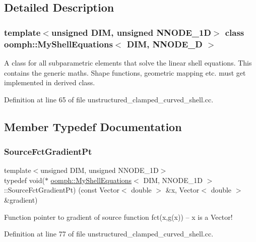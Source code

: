 \subsection{Detailed Description}
\subsubsection*{template$<$unsigned D\+IM, unsigned N\+N\+O\+D\+E\+\_\+1D$>$\newline
class oomph\+::\+My\+Shell\+Equations$<$ D\+I\+M, N\+N\+O\+D\+E\+\_\+D $>$}

A class for all subparametric elements that solve the linear shell equations. This contains the generic maths. Shape functions, geometric mapping etc. must get implemented in derived class. 

Definition at line 65 of file unstructured\+\_\+clamped\+\_\+curved\+\_\+shell.\+cc.



\subsection{Member Typedef Documentation}
\mbox{\label{classoomph_1_1MyShellEquations_a954dcc1b78710f331ed390b716aa07dd}} 
\subsubsection{\texorpdfstring{Source\+Fct\+Gradient\+Pt}{SourceFctGradientPt}}
{\footnotesize\ttfamily template$<$unsigned D\+IM, unsigned N\+N\+O\+D\+E\+\_\+1D$>$ \\
typedef void($\ast$ \hyperlink{classoomph_1_1MyShellEquations}{oomph\+::\+My\+Shell\+Equations}$<$ D\+IM, N\+N\+O\+D\+E\+\_\+1D $>$\+::Source\+Fct\+Gradient\+Pt) (const Vector$<$ double $>$ \&x, Vector$<$ double $>$ \&gradient)}



Function pointer to gradient of source function fct(x,g(x)) -- x is a Vector! 



Definition at line 77 of file unstructured\+\_\+clamped\+\_\+curved\+\_\+shell.\+cc.

\mbox{\label{classoomph_1_1MyShellEquations_a056d2488b6e65787f5c9935a321b7a9b}} 
